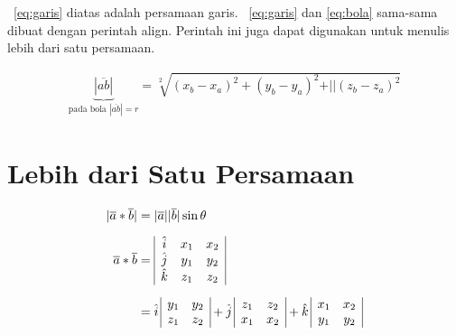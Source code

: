     \equ~\ref{eq:garis} diatas adalah persamaan garis.
    \equ~\ref{eq:garis} dan \ref{eq:bola} sama-sama dibuat dengan perintah \bslash
    align.
    Perintah ini juga dapat digunakan untuk menulis lebih dari satu persamaan.

    \noindent \begin{align}\label{eq:bola}
        \underbrace{|\overline{ab}|}_{\text{pada bola $|\overline{ab}| = r$}}
        = \sqrt[2]{(x_{b} - x_{a})^{2} + (y_{b} - y_{a})^{2} +
            \vert\vert(z_{b} - z_{a})^{2}}
    \end{align}

    \section{Lebih dari Satu Persamaan}
    \label{sec:multiEqu}
    \noindent \begin{align}\label{eq:matriks}
        |\overline{a} * \overline{b}| & = |\overline{a}| |\overline{b}| \sin\theta
        \\[0.2cm]
        \overline{a} * \overline{b}   & =
        \begin{array}{| c c c |}
            \hat{i} & x_{1} & x_{2} \\
            \hat{j} & y_{1} & y_{2} \\
            \hat{k} & z_{1} & z_{2} \\
        \end{array} \nonumber                                                    \\[0.2cm]
                                      & = \hat{i} \,
        \begin{array}{ | c c | }
            y_{1} & y_{2} \\
            z_{1} & z_{2} \\
        \end{array}
        + \hat{j} \,
        \begin{array}{ | c c | }
            z_{1} & z_{2} \\
            x_{1} & x_{2} \\
        \end{array}
        + \hat{k} \,
        \begin{array}{ | c c | }
            x_{1} & x_{2} \\
            y_{1} & y_{2} \\
        \end{array}
        \nonumber
    \end{align}

